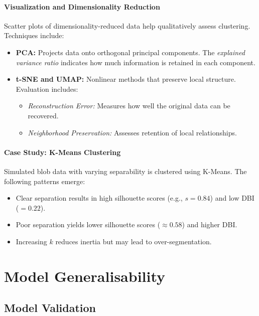 \documentclass[9pt]{extarticle}
\begin{document}
\paragraph{Visualization and Dimensionality Reduction}

Scatter plots of dimensionality-reduced data help qualitatively assess clustering. Techniques include:
\begin{itemize}
    \item \textbf{PCA:} Projects data onto orthogonal principal components. The \textit{explained variance ratio} indicates how much information is retained in each component.
    \item \textbf{t-SNE and UMAP:} Nonlinear methods that preserve local structure. Evaluation includes:
        \begin{itemize}
            \item \textit{Reconstruction Error:} Measures how well the original data can be recovered.
            \item \textit{Neighborhood Preservation:} Assesses retention of local relationships.
        \end{itemize}
\end{itemize}

\paragraph{Case Study: K-Means Clustering}

Simulated blob data with varying separability is clustered using K-Means. The following patterns emerge:
\begin{itemize}
    \item Clear separation results in high silhouette scores (e.g., $s = 0.84$) and low DBI ($= 0.22$).
    \item Poor separation yields lower silhouette scores ($\approx 0.58$) and higher DBI.
    \item Increasing $k$ reduces inertia but may lead to over-segmentation.
\end{itemize}





\section{Model Generalisability}
\subsection{Model Validation}
\end{document}
